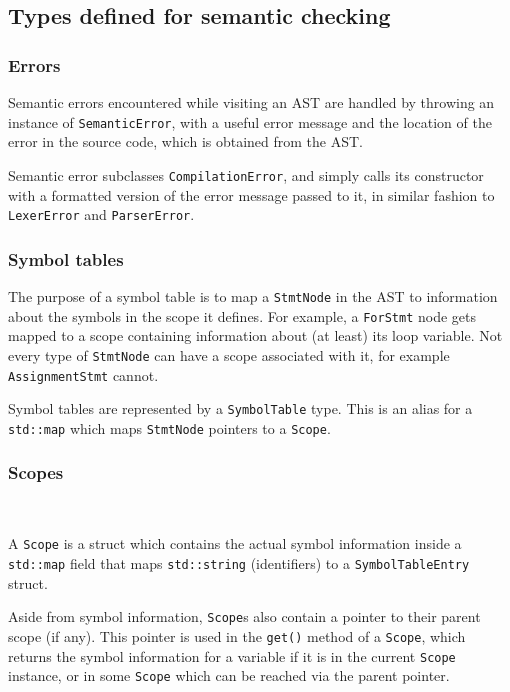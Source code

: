 \documentclass[11pt,a4paper]{scrartcl}
\begin{document}
\subsection{Types defined for semantic checking}

\subsubsection{Errors}

Semantic errors encountered while visiting an AST are handled by throwing an instance of \verb|SemanticError|, with a useful error message and the location of the error in the source code, which is obtained from the AST.

Semantic error subclasses \verb|CompilationError|, and simply calls its constructor with a formatted version of the error message passed to it, in similar fashion to \verb|LexerError| and \verb|ParserError|.

\subsubsection{Symbol tables}

The purpose of a symbol table is to map a \verb|StmtNode| in the AST to information about the symbols in the scope it defines. For example, a \verb|ForStmt| node gets mapped to a scope containing information about (at least) its loop variable. Not every type of \verb|StmtNode| can have a scope associated with it, for example \verb|AssignmentStmt| cannot.

Symbol tables are represented by a \Verb|SymbolTable| type. This is an alias for a \verb|std::map| which maps \verb|StmtNode| pointers to a \verb|Scope|.

\subsubsection{Scopes}~\label{scope-sect}

A \verb|Scope| is a struct which contains the actual symbol information inside a \verb|std::map| field that maps \verb|std::string| (identifiers) to a \verb|SymbolTableEntry| struct.

Aside from symbol information, \verb|Scope|s also contain a pointer to their parent scope (if any). This pointer is used in the \verb|get()| method of a \verb|Scope|, which returns the symbol information for a variable if it is in the current \verb|Scope| instance, or in some \verb|Scope| which can be reached via the parent pointer.
\end{document}
